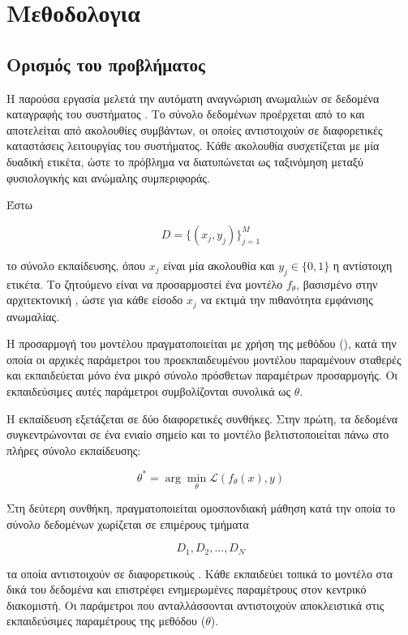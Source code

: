 \chapter{Μεθοδολογια}

\section{Ορισμός του προβλήματος}

Η παρούσα εργασία μελετά την αυτόματη αναγνώριση ανωμαλιών σε δεδομένα καταγραφής του συστήματος . Το σύνολο δεδομένων προέρχεται από το  και αποτελείται από ακολουθίες συμβάντων, οι οποίες αντιστοιχούν σε διαφορετικές καταστάσεις λειτουργίας του συστήματος. Κάθε ακολουθία συσχετίζεται με μία δυαδική ετικέτα, ώστε το πρόβλημα να διατυπώνεται ως ταξινόμηση μεταξύ φυσιολογικής και ανώμαλης συμπεριφοράς.

Έστω

\[
D = \{(x_j, y_j)\}_{j=1}^{M}
\]

το σύνολο εκπαίδευσης, όπου \(x_j\) είναι μία ακολουθία  και \(y_j \in \{0,1\}\) η αντίστοιχη ετικέτα. Το ζητούμενο είναι να προσαρμοστεί ένα μοντέλο \(f_{\theta}\), βασισμένο στην αρχιτεκτονική , ώστε για κάθε είσοδο \(x_j\) να εκτιμά την πιθανότητα εμφάνισης ανωμαλίας.

Η προσαρμογή του μοντέλου πραγματοποιείται με χρήση της μεθόδου  (), κατά την οποία οι αρχικές παράμετροι του προεκπαιδευμένου μοντέλου παραμένουν σταθερές και εκπαιδεύεται μόνο ένα μικρό σύνολο πρόσθετων παραμέτρων προσαρμογής. Οι εκπαιδεύσιμες αυτές παράμετροι συμβολίζονται συνολικά ως \(\theta\).

Η εκπαίδευση εξετάζεται σε δύο διαφορετικές συνθήκες. Στην πρώτη, τα δεδομένα συγκεντρώνονται σε ένα ενιαίο σημείο και το μοντέλο βελτιστοποιείται πάνω στο πλήρες σύνολο εκπαίδευσης:

\[
\theta^{*}
=
\arg\min_{\theta}
\mathcal{L}(f_{\theta}(x), y)
\]

Στη δεύτερη συνθήκη, πραγματοποιείται ομοσπονδιακή μάθηση κατά την οποία το σύνολο δεδομένων χωρίζεται σε επιμέρους τμήματα

\[
D_1,D_2,\ldots,D_N
\]

τα οποία αντιστοιχούν σε διαφορετικούς . Κάθε  εκπαιδεύει τοπικά το μοντέλο στα δικά του δεδομένα και επιστρέφει ενημερωμένες παραμέτρους στον κεντρικό διακομιστή. Οι παράμετροι που ανταλλάσσονται αντιστοιχούν αποκλειστικά στις εκπαιδεύσιμες παραμέτρους της μεθόδου   ($\theta$).


